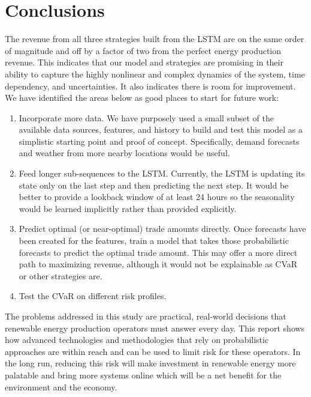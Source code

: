 \documentclass[
  journal,
]{IEEEtran}%
\providecommand{\tightlist}{%
  \setlength{\itemsep}{0pt}\setlength{\parskip}{0pt}}\usepackage{longtable,booktabs,array}
\begin{document}
\section{Conclusions}\label{conclusions}

The revenue from all three strategies built from the LSTM are on the
same order of magnitude and off by a factor of two from the perfect
energy production revenue. This indicates that our model and strategies
are promising in their ability to capture the highly nonlinear and
complex dynamics of the system, time dependency, and uncertainties. It
also indicates there is room for improvement. We have identified the
areas below as good places to start for future work:

\begin{enumerate}
\def\labelenumi{\arabic{enumi}.}
\tightlist
\item
  Incorporate more data. We have purposely used a small subset of the
  available data sources, features, and history to build and test this
  model as a simplistic starting point and proof of concept.
  Specifically, demand forecasts and weather from more nearby locations
  would be useful.
\item
  Feed longer sub-sequences to the LSTM. Currently, the LSTM is updating
  its state only on the last step and then predicting the next step. It
  would be better to provide a lookback window of at least 24 hours so
  the seasonality would be learned implicitly rather than provided
  explicitly.
\item
  Predict optimal (or near-optimal) trade amounts directly. Once
  forecasts have been created for the features, train a model that takes
  those probabilistic forecasts to predict the optimal trade amount.
  This may offer a more direct path to maximizing revenue, although it
  would not be explainable as CVaR or other strategies are.
\item
  Test the CVaR on different risk profiles.
\end{enumerate}

The problems addressed in this study are practical, real-world decisions
that renewable energy production operators must answer every day. This
report shows how advanced technologies and methodologies that rely on
probabilistic approaches are within reach and can be used to limit risk
for these operators. In the long run, reducing this risk will make
investment in renewable energy more palatable and bring more systems
online which will be a net benefit for the environment and the economy.
\end{document}
